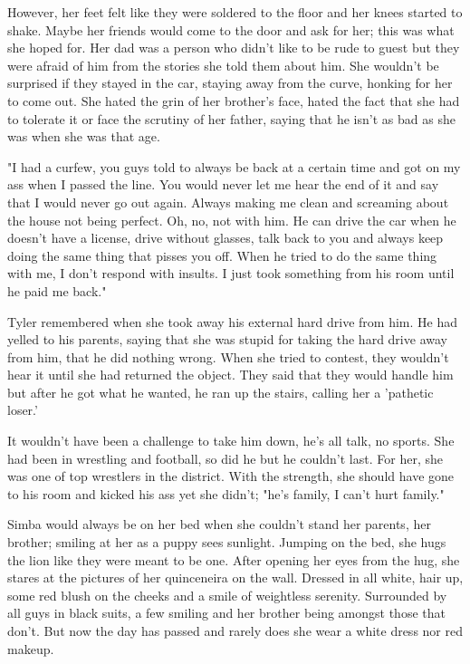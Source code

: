 \begin{Document}
        However, her feet felt like they were soldered to the floor and her knees started to shake. Maybe her friends would come to the door and ask for
    her; this was what she hoped for. Her dad was a person who didn't like to be rude to guest but they were afraid of him from the stories she told them
    about him. She wouldn't be surprised if they stayed in the car, staying away from the curve, honking for her to come out. She hated the grin of her
    brother's face, hated the fact that she had to tolerate it or face the scrutiny of her father, saying that he isn't as bad as she was when she was
    that age.

        "I had a curfew, you guys told to always be back at a certain time and got on my ass when I passed the line. You would never let me hear the end
    of it and say that I would never go out again. Always making me clean and screaming about the house not being perfect. Oh, no, not with him. He can drive
    the car when he doesn't have a license, drive without glasses, talk back to you and always keep doing the same thing that pisses you off. When he
    tried to do the same thing with me, I don't respond with insults. I just took something from his room until he paid me back."

        Tyler remembered when she took away his external hard drive from him. He had yelled to his parents, saying that she was stupid for taking the
    hard drive away from him, that he did nothing wrong. When she tried to contest, they wouldn't hear it until she had returned the object. They said
    that they would handle him but after he got what he wanted, he ran up the stairs, calling her a 'pathetic loser.'

        It wouldn't have been a challenge to take him down, he's all talk, no sports. She had been in wrestling and football, so did he but he couldn't
    last. For her, she was one of top wrestlers in the district. With the strength, she should have gone to his room and kicked his ass yet she didn't;
    "he's family, I can't hurt family."

        Simba would always be on her bed when she couldn't stand her parents, her brother; smiling at her as a puppy sees sunlight. Jumping on the bed, she
    hugs the lion like they were meant to be one. After opening her eyes from the hug, she stares at the pictures of her quinceneira on the wall. Dressed
    in all white, hair up, some red blush on the cheeks and a smile of weightless serenity. Surrounded by all guys in black suits, a few smiling and her
    brother being amongst those that don't. But now the day has passed and rarely does she wear a white dress nor red makeup.


\end{Document}
